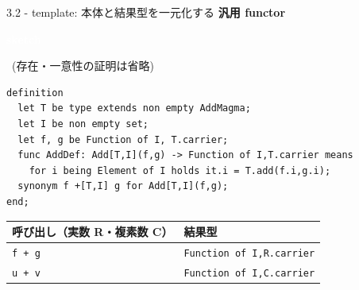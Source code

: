 \documentclass[dvipdfmx,aspectratio=169,11pt]{beamer}
\newcommand{\statusbadge}[2]{\colorbox{#1}{\textcolor{white}{\strut\scriptsize\sffamily\bfseries #2}}}
\newcommand{\badgeSketch}{\statusbadge{orange!75!black}{sketch}}
\begin{document}
\begin{frame}[fragile,t]{3.2 - template: 本体と結果型を一元化する}
\smallskip
\textbf{汎用 functor}~\badgeSketch~{\footnotesize(存在・一意性の証明は省略)}
\begin{lstlisting}[language={mizar},basicstyle=\ttfamily\footnotesize]
definition
  let T be type extends non empty AddMagma;
  let I be non empty set;
  let f, g be Function of I, T.carrier;
  func AddDef: Add[T,I](f,g) -> Function of I,T.carrier means
    for i being Element of I holds it.i = T.add(f.i,g.i);
  synonym f +[T,I] g for Add[T,I](f,g);
end;
\end{lstlisting}
\par{}
\begin{footnotesize}
\setlength{\tabcolsep}{3pt}
\renewcommand{\arraystretch}{1.15}
\begin{tabularx}{\textwidth}{l>{\raggedright\arraybackslash}X}
\toprule
\textbf{呼び出し（実数 R・複素数 C）\footnotemark[1]} & \textbf{結果型} \\
\midrule
\texttt{f + g} & \texttt{Function of I,R.carrier} \\
\texttt{u + v} & \texttt{Function of I,C.carrier} \\
\bottomrule
\end{tabularx}
\end{footnotesize}


\end{frame}
\end{document}
